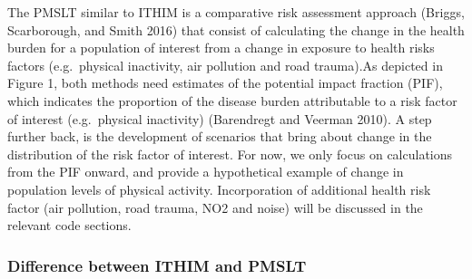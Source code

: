 \documentclass[]{article}
\begin{document}
The PMSLT similar to ITHIM is a comparative risk assessment approach
(Briggs, Scarborough, and Smith 2016) that consist of calculating the
change in the health burden for a population of interest from a change
in exposure to health risks factors (e.g.~physical inactivity, air
pollution and road trauma).As depicted in Figure 1, both methods need
estimates of the potential impact fraction (PIF), which indicates the
proportion of the disease burden attributable to a risk factor of
interest (e.g.~physical inactivity) (Barendregt and Veerman 2010). A
step further back, is the development of scenarios that bring about
change in the distribution of the risk factor of interest. For now, we
only focus on calculations from the PIF onward, and provide a
hypothetical example of change in population levels of physical
activity. Incorporation of additional health risk factor (air pollution,
road trauma, NO2 and noise) will be discussed in the relevant code
sections.

\subsubsection{Difference between ITHIM and
PMSLT}\label{difference-between-ithim-and-pmslt}
\end{document}
